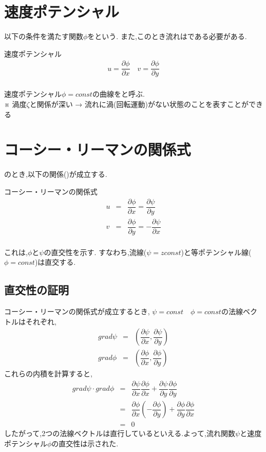 \documentclass[a4paper]{jsarticle}
\begin{document}
\section{速度ポテンシャル}
以下の条件を満たす関数$\phi$をという.
また,このとき流れはである必要がある.
\begin{itembox}[l]{速度ポテンシャル}
    \begin{eqnarray*}
        u=\dfrac{\partial \phi}{\partial x}\quad v=\dfrac{\partial \phi}{\partial y}\\
    \end{eqnarray*}
\end{itembox}
速度ポテンシャル$\phi = const$の曲線をと呼ぶ.\\
※ 渦度$\zeta$と関係が深い → 流れに渦(回転運動)がない状態のことを表すことができる
\section{コーシー・リーマンの関係式}
のとき,以下の関係()が成立する.
\begin{itembox}[l]{コーシー・リーマンの関係式}
    \begin{eqnarray*}
        u&=&\dfrac{\partial \phi}{\partial x}=\dfrac{\partial \psi}{\partial y}\\
        v&=&\dfrac{\partial \phi}{\partial y}=-\dfrac{\partial \psi}{\partial x}\\
    \end{eqnarray*}
\end{itembox}
これは,$\phi$と$\psi$の直交性を示す.
すなわち,流線($\psi=zconst$)と等ポテンシャル線($\phi=const$)は直交する.
\subsection{直交性の証明}
コーシー・リーマンの関係式が成立するとき,
$\psi=const\quad \phi=const$の法線ベクトルはそれぞれ,
\begin{eqnarray*}
    grad \psi&=&\left(\dfrac{\partial \psi}{\partial x}, \dfrac{\partial \psi}{\partial y}\right)\\
    grad \phi&=&\left(\dfrac{\partial \phi}{\partial x}, \dfrac{\partial \phi}{\partial y}\right)
\end{eqnarray*}
これらの内積を計算すると,
\begin{eqnarray*}
    grad\psi \cdot grad\phi &=& \dfrac{\partial \psi}{\partial x}\dfrac{\partial \phi}{\partial x} +\dfrac{\partial \psi}{\partial y}\dfrac{\partial \phi}{\partial y}\\
    &=&\dfrac{\partial \phi}{\partial x}\left(-\dfrac{\partial \phi}{\partial y}\right)+\dfrac{\partial \phi}{\partial y}\dfrac{\partial \phi}{\partial x}\\
    &=&0
\end{eqnarray*}
したがって,2つの法線ベクトルは直行しているといえる.よって,流れ関数$\psi$と速度ポテンシャル$\phi$の直交性は示された.
\end{document}
